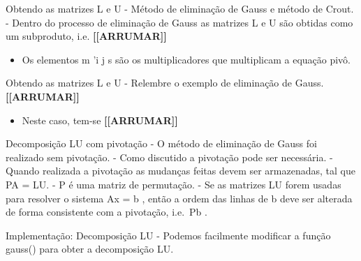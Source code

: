 \documentclass[
]{article}
\providecommand{\tightlist}{%
  \setlength{\itemsep}{0pt}\setlength{\parskip}{0pt}}
\begin{document}
Obtendo as matrizes L e U - Método de eliminação de Gauss e método de
Crout. - Dentro do processo de eliminação de Gauss as matrizes L e U são
obtidas como um subproduto, i.e. \textbf{{[}{[}ARRUMAR{]}{]}}

\begin{itemize}
\tightlist
\item
  Os elementos m 'i j s são os multiplicadores que multiplicam a equação
  pivô.
\end{itemize}

Obtendo as matrizes L e U - Relembre o exemplo de eliminação de Gauss.
\textbf{{[}{[}ARRUMAR{]}{]}}

\begin{itemize}
\tightlist
\item
  Neste caso, tem-se \textbf{{[}{[}ARRUMAR{]}{]}}
\end{itemize}

Decomposição LU com pivotação - O método de eliminação de Gauss foi
realizado sem pivotação. - Como discutido a pivotação pode ser
necessária. - Quando realizada a pivotação as mudanças feitas devem ser
armazenadas, tal que PA = LU. - P é uma matriz de permutação. - Se as
matrizes LU forem usadas para resolver o sistema Ax = b , então a ordem
das linhas de b deve ser alterada de forma consistente com a pivotação,
i.e.~Pb .

Implementação: Decomposição LU - Podemos facilmente modificar a função
gauss() para obter a decomposição LU.
\end{document}
